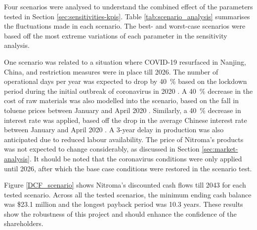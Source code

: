 Four scenarios were analysed to understand the combined effect of the parameters tested in Section \ref{sec:sensitivities-kpis}. Table \ref{tab:scenario_analysis} summarises the fluctuations made in each scenario. The best- and worst-case scenarios were based off the most extreme variations of each parameter in the sensitivity analysis. 

One scenario was related to a situation where COVID-19 resurfaced in Nanjing, China, and restriction measures were in place till 2026. The number of operational days per year was expected to drop by \SI{40}{\percent} based on the lockdown period during the initial outbreak of coronavirus in 2020 \cite{bbc_news_coronavirus_nodate}. A \SI{40}{\percent} decrease in the cost of raw materials was also modelled into the scenario, based on the fall in toluene prices between January and April 2020 \cite{sunsirs_commodity_group_china_2021}. Similarly, a \SI{40}{\percent} decrease in interest rate was applied, based off the drop in the average Chinese interest rate between January and April 2020 \cite{stati}. A 3-year delay in production was also anticipated due to reduced labour availability. The price of Nitroma’s products was not expected to change considerably, as discussed in Section \ref{sec:market-analysis}. It should be noted that the coronavirus conditions were only applied until 2026, after which the base case conditions were restored in the scenario test.

Figure \ref{DCF_scenario} shows Nitroma’s discounted cash flows till 2043 for each tested scenario. Across all the tested scenarios, the minimum ending cash balance was \$23.1 million and the longest payback period was 10.3 years. These results show the robustness of this project and should enhance the confidence of the shareholders.

